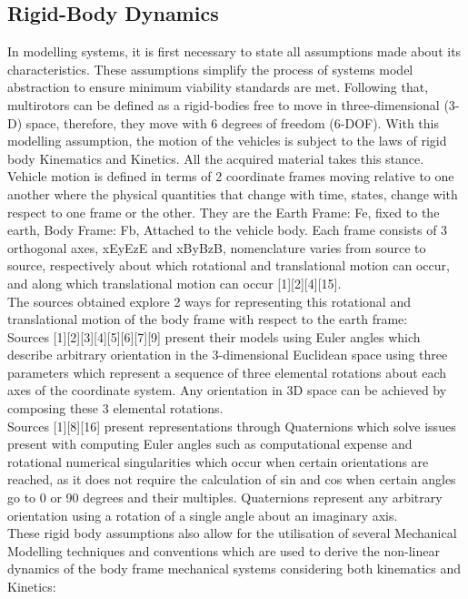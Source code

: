 \documentclass[12pt,a4paper,twoside]{report}
\begin{document}
			\subsection*{Rigid-Body Dynamics}
				In modelling systems, it is first necessary to state all assumptions made about its characteristics. These assumptions simplify the process of systems model abstraction to ensure minimum viability standards are met. Following that, multirotors can be defined as a rigid-bodies free to move in three-dimensional (3-D) space, therefore, they move with 6 degrees of freedom (6-DOF). With this modelling assumption, the motion of the vehicles is subject to the laws of rigid body Kinematics and Kinetics. All the acquired material takes this stance. 
				\\
				Vehicle motion is defined in terms of 2 coordinate frames moving relative to one another where the physical quantities that change with time, states, change with respect to one frame or the other. They are the Earth Frame: Fe, fixed to the earth, Body Frame: Fb, Attached to the vehicle body. Each frame consists of 3 orthogonal axes, xEyEzE and xByBzB, nomenclature varies from source to source, respectively about which rotational and translational motion can occur, and along which translational motion can occur [1][2][4][15]. 
				\\
				The sources obtained explore 2 ways for representing this rotational and translational motion of the body frame with respect to the earth frame:
				\\
				Sources [1][2][3][4][5][6][7][9] present their models using Euler angles which describe arbitrary orientation in the 3-dimensional Euclidean space using three parameters which represent a sequence of three elemental rotations about each axes of the coordinate system. Any orientation in 3D space can be achieved by composing these 3 elemental rotations.
				\\ 
				Sources [1][8][16] present representations through Quaternions which solve issues present with computing Euler angles such as computational expense and rotational numerical singularities which occur when certain orientations are reached, as it does not require the calculation of sin and cos when certain angles go to 0 or 90 degrees and their multiples. Quaternions represent any arbitrary orientation using a rotation of a single angle about an imaginary axis. 
				\\
				These rigid body assumptions also allow for the utilisation of several Mechanical Modelling techniques and conventions which are used to derive the non-linear dynamics of the body frame mechanical systems considering both kinematics and Kinetics:
				
\end{document}

